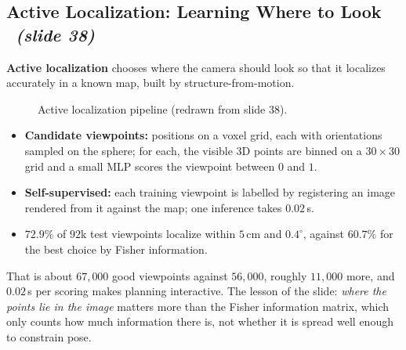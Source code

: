 \documentclass[11pt,a4paper]{article}
\newcommand{\slrs}[1]{\texorpdfstring{\ \emph{(slide #1)}}{ (slide #1)}}
\begin{document}
\subsection{Active Localization: Learning Where to Look \slrs{38}}
\textbf{Active localization} chooses where the camera should look so that it localizes accurately in a known map, built by structure-from-motion.
\begin{figure}[htbp]\centering
{}
\caption{Active localization pipeline (redrawn from slide 38).}
\end{figure}
\begin{itemize}[nosep]
\item \textbf{Candidate viewpoints:} positions on a voxel grid, each with orientations sampled on the sphere; for each, the visible 3D points are binned on a $30\times30$ grid and a small MLP scores the viewpoint between $0$ and $1$.
\item \textbf{Self-supervised:} each training viewpoint is labelled by registering an image rendered from it against the map; one inference takes $0.02$\,s.
\item $72.9\%$ of $92$k test viewpoints localize within $5$\,cm and $0.4^\circ$, against $60.7\%$ for the best choice by Fisher information.
\end{itemize}
\begin{intuition}
That is about $67{,}000$ good viewpoints against $56{,}000$, roughly $11{,}000$ more, and $0.02$\,s per scoring makes planning interactive. The lesson of the slide: \emph{where the points lie in the image} matters more than the Fisher information matrix, which only counts how much information there is, not whether it is spread well enough to constrain pose.
\end{intuition}
\end{document}

